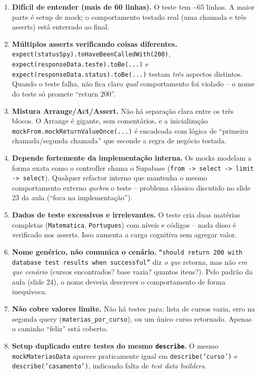 \documentclass[12pt,a4paper]{article}
\begin{document}
\begin{enumerate}[leftmargin=1.5em]

\item \textbf{Difícil de entender (mais de 60 linhas).} O teste tem
\textasciitilde{}65 linhas. A maior parte é setup de mock; o
comportamento testado real (uma chamada e três asserts) está enterrado
ao final.

\item \textbf{Múltiplos asserts verificando coisas diferentes.}
\texttt{expect(statusSpy).toHaveBeenCalledWith(200)},
\texttt{expect(responseData.teste).toBe(...)} e
\texttt{expect(responseData.status).toBe(...)} testam
\emph{três} aspectos distintos. Quando o teste falha, não fica claro
\emph{qual} comportamento foi violado -- o nome do teste só promete
``return 200''.

\item \textbf{Mistura Arrange/Act/Assert.} Não há separação clara entre
os três blocos. O Arrange é gigante, sem comentários, e a inicialização
\texttt{mockFrom.mockReturnValueOnce(...)} é encadeada com lógica de
``primeira chamada/segunda chamada'' que esconde a regra de negócio
testada.

\item \textbf{Depende fortemente da implementação interna.} Os mocks
modelam a forma exata como o controller chama o Supabase
(\texttt{from -> select -> limit -> select}). Qualquer refactor
interno que mantenha o mesmo comportamento externo \emph{quebra} o
teste -- problema clássico discutido no slide 23 da aula
(``foca na implementação'').

\item \textbf{Dados de teste excessivos e irrelevantes.} O teste cria
duas matérias completas (\texttt{Matematica}, \texttt{Portugues}) com
níveis e códigos -- nada disso é verificado nos asserts. Isso
aumenta a carga cognitiva sem agregar valor.

\item \textbf{Nome genérico, não comunica o cenário.}
\texttt{``should return 200 with database test results when successful''}
diz \emph{o que} retorna, mas não \emph{em que cenário} (cursos
encontrados? base vazia? quantos itens?). Pelo padrão da aula
(slide 24), o nome deveria descrever o comportamento de forma
inequívoca.

\item \textbf{Não cobre valores limite.} Não há testes para:
lista de cursos vazia, erro na segunda query (\texttt{materias\_por\_curso}),
ou um único curso retornado. Apenas o caminho ``feliz'' está coberto.

\item \textbf{Setup duplicado entre testes do mesmo \texttt{describe}.}
O mesmo \texttt{mockMateriasData} aparece praticamente igual em
\texttt{describe('curso')} e \texttt{describe('casamento')}, indicando
falta de \emph{test data builders}.

\end{enumerate}
\end{document}
